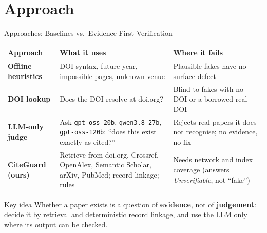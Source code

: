 \documentclass[aspectratio=169,10pt]{beamer}
\newcommand{\hl}[1]{\textcolor{accentblue}{\textbf{#1}}}
\begin{document}
\section{Approach}

\begin{frame}{Approaches: Baselines vs.\ Evidence-First Verification}
  \centering
  \scriptsize
  \renewcommand{\arraystretch}{1.3}
  \begin{tabular}{>{\bfseries}P{2.6cm} P{4.4cm} P{4.6cm}}
    \toprule
    Approach & What it uses & Where it fails \\
    \midrule
    Offline heuristics & DOI syntax, future year, impossible pages, unknown venue & Plausible fakes have no surface defect \\
    DOI lookup \cite{hallmark} & Does the DOI resolve at doi.org? & Blind to fakes with no DOI or a borrowed real DOI \\
    LLM-only judge & Ask \texttt{gpt-oss-20b}, \texttt{qwen3.8-27b}, \texttt{gpt-oss-120b}: ``does this exist exactly as cited?'' & Rejects real papers it does not recognise; no evidence, no fix \\
    CiteGuard (ours) & Retrieve from doi.org, Crossref, OpenAlex, Semantic Scholar, arXiv, PubMed; record linkage; rules & Needs network and index coverage (answers \emph{Unverifiable}, not ``fake'') \\
    \bottomrule
  \end{tabular}
  \vspace{6pt}

  \begin{exampleblock}{Key idea}
    \small Whether a paper exists is a question of \hl{evidence}, not of \hl{judgement}: decide it by
    retrieval and deterministic record linkage, and use the LLM only where its output can be checked.
  \end{exampleblock}
\end{frame}
\end{document}
